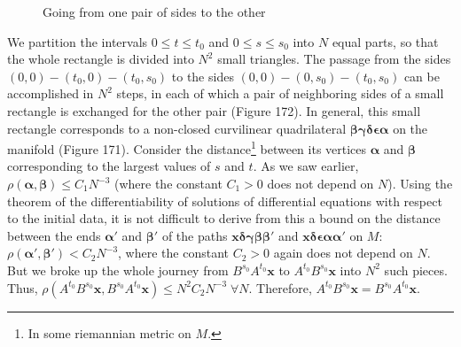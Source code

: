 \documentclass{book}
\numberwithin{equation}{section}
\theoremstyle{plain}
\let\oldendproof\endproof
\renewenvironment{proof}[1][\proofname]{%
  \oldproof[\textsc{#1}]%
}{\oldendproof}
\theoremstyle{definition}
\theoremstyle{remark}
\theoremstyle{smallcap}
\numberwithin{prob}{section}
\begin{document}
\begin{proof}
\begin{figure}[h]
    \caption{Going from one pair of sides to the other}
  \end{figure}
  We partition the intervals $0 \le t \le t_0$
  and $0 \le s \le s_0$ into $N$ equal parts,
  so that the whole rectangle is divided into $N^2$
  small triangles.
  The passage from the sides $(0,0) - (t_0, 0) -(t_0, s_0)$
  to the sides $(0, 0) - (0, s_0) - (t_0, s_0)$
  can be accomplished in $N^2$ steps,
  in each of which a pair of neighboring sides of
  a small rectangle is exchanged for the other pair (Figure 172).
  In general,
  this small rectangle corresponds to a non-closed curvilinear
  quadrilateral $\pmb\beta\pmb\gamma\pmb\delta\pmb\epsilon\pmb\alpha$
  on the manifold (Figure 171).
  Consider the distance\footnote{In some riemannian metric on $M$.}
  between its vertices $\pmb\alpha$ and $\pmb\beta$
  corresponding to the largest values of $s$ and $t$.
  As we saw earlier,
  $\rho(\pmb\alpha, \pmb\beta) \le C_1 N^{-3}$
  (where the constant $C_1 > 0$ does not depend on $N$).
  Using the theorem of the differentiability of solutions
  of differential equations with respect to the initial data,
  it is not difficult to derive from this a bound on the distance
  between the ends $\pmb\alpha'$ and $\pmb\beta'$ of the paths
  $\mathbf x\pmb\delta\pmb\gamma\pmb\beta\pmb\beta'$
  and
  $\mathbf x\pmb\delta\pmb\epsilon\pmb\alpha\pmb\alpha'$
  on $M$:
  $\rho(\pmb\alpha', \pmb\beta') < C_2 N^{-3}$,
  where the constant $C_2 > 0$ again does not depend on $N$.
  But we broke up the whole journey from $B^{s_0}A^{t_0}\mathbf x$
  to $A^{t_0}B^{s_0}\mathbf x$ into $N^2$ such pieces.
  Thus, $\rho(A^{t_0}B^{s_0}\mathbf x, B^{s_0}A^{t_0}\mathbf x)
  \le N^2 C_2 N^{-3} \; \forall N$.
  Therefore, $A^{t_0}B^{s_0}\mathbf x = B^{s_0}A^{t_0}\mathbf x$.

\end{proof}
\end{document}
